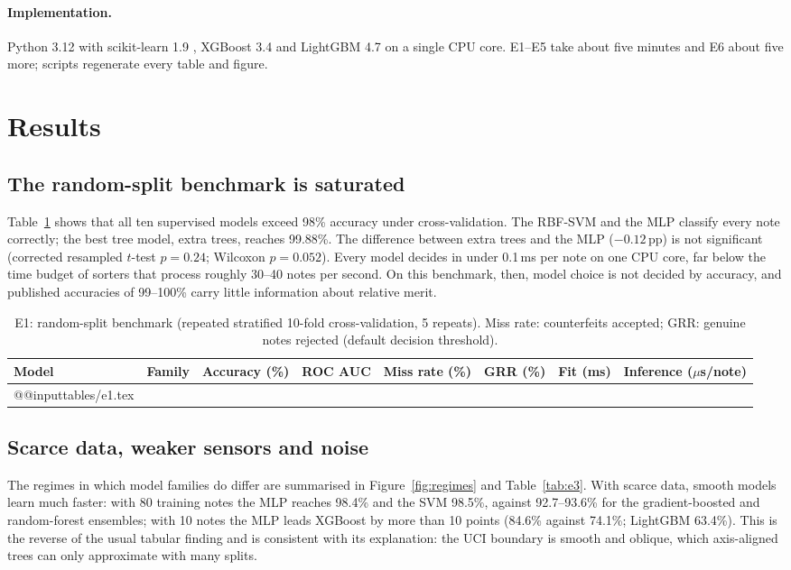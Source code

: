 \documentclass{article}
\makeatletter
\theoremstyle{definition}
\theoremstyle{remark}
\newcommand{\pp}{\,pp}
\newcommand{\inputrows}[1]{\csname @@input\endcsname #1 }
\makeatother
\begin{document}
\paragraph{Implementation.} Python 3.12 with scikit-learn 1.9 \citep{pedregosa2011scikit}, XGBoost 3.4 and LightGBM 4.7 on a single CPU core. E1--E5 take about five minutes and E6 about five more; scripts regenerate every table and figure.

\section{Results}
\label{sec:results}

\subsection{The random-split benchmark is saturated}

Table~\ref{tab:e1} shows that all ten supervised models exceed 98\% accuracy under cross-validation. The RBF-SVM and the MLP classify every note correctly; the best tree model, extra trees, reaches 99.88\%. The difference between extra trees and the MLP ($-0.12$\pp) is not significant (corrected resampled $t$-test $p=0.24$; Wilcoxon $p=0.052$). Every model decides in under 0.1\,ms per note on one CPU core, far below the time budget of sorters that process roughly 30--40 notes per second. On this benchmark, then, model choice is not decided by accuracy, and published accuracies of 99--100\% carry little information about relative merit.

\begin{table}[t]
\centering
\small
\caption{E1: random-split benchmark (repeated stratified 10-fold cross-validation, 5 repeats). Miss rate: counterfeits accepted; GRR: genuine notes rejected (default decision threshold).}
\label{tab:e1}
\begin{tabular}{@{}llcccccc@{}}
\toprule
Model & Family & Accuracy (\%) & ROC AUC & Miss rate (\%) & GRR (\%) & Fit (ms) & Inference ($\mu$s/note) \\
\midrule
\inputrows{tables/e1.tex}
\bottomrule
\end{tabular}
\end{table}

\subsection{Scarce data, weaker sensors and noise}

The regimes in which model families do differ are summarised in Figure~\ref{fig:regimes} and Table~\ref{tab:e3}. With scarce data, smooth models learn much faster: with 80 training notes the MLP reaches 98.4\% and the SVM 98.5\%, against 92.7--93.6\% for the gradient-boosted and random-forest ensembles; with 10 notes the MLP leads XGBoost by more than 10 points (84.6\% against 74.1\%; LightGBM 63.4\%). This is the reverse of the usual tabular finding and is consistent with its explanation: the UCI boundary is smooth and oblique, which axis-aligned trees can only approximate with many splits.
\end{document}
